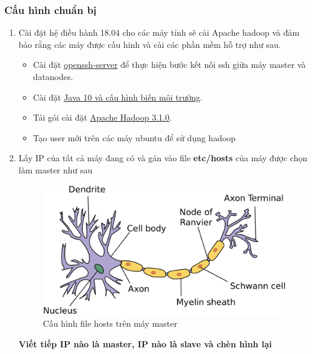 		\subsubsection{Cấu hình chuẩn bị}
		\begin{enumerate}
			\item Cài đặt hệ điều hành 18.04 cho các máy tính sẽ cài Apache hadoop và đảm bảo rằng các máy được cấu hinh và cài các phần mềm hỗ trợ như sau.
			\begin{itemize}
				\item Cài đặt \href{https://help.ubuntu.com/lts/serverguide/openssh-server.html}{openssh-server} để thực hiện bước kết nối ssh giữa máy master và datanodes.
				\item Cài đặt \href{https://www.linuxuprising.com/2018/04/install-oracle-java-10-in-ubuntu-or.html}{Java 10 và cấu hình biến môi trường}.
				\item Tải gói cài đặt \href{http://hadoop.apache.org/releases.html}{Apache Hadoop 3.1.0}.
				\item Tạo user mới trên các máy ubuntu để sử dụng hadoop
			\end{itemize}
			\item Lấy IP của tất cả máy đang có và gán vào file \textbf{etc/hosts} của máy được chọn làm master như sau
			
			\begin{figure}[h!]
				\centering
				\includegraphics[scale=0.18]{charts/neuron.png}
				\caption{Cấu hình file hosts trên máy master}
				\label{fig:hosts}
			\end{figure}
			\textbf{Viết tiếp IP nào là master, IP nào là slave và chèn hình lại}
			
		\end{enumerate}
		
